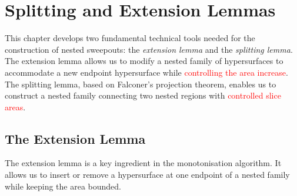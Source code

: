 \chapter{Splitting and Extension Lemmas}\label{ch:splitting-and-extension}
This chapter develops two fundamental technical tools needed for the construction of nested sweepouts: the \emph{extension lemma} and the \emph{splitting lemma}. The extension lemma allows us to modify a nested family of hypersurfaces to accommodate a new endpoint hypersurface while \textcolor{red}{controlling the area increase}. The splitting lemma, based on Falconer's projection theorem, enables us to construct a nested family connecting two nested regions with \textcolor{red}{controlled slice areas}.

\section{The Extension Lemma}\label{sec:extension-lemma}
The extension lemma is a key ingredient in the monotonisation algorithm. It allows us to insert or remove a hypersurface at one endpoint of a nested family while keeping the area bounded.

